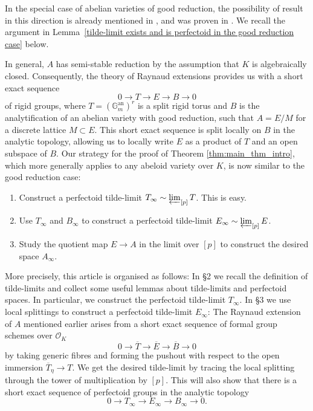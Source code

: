 \documentclass[10pt,oneside]{amsart}
\theoremstyle{definition}
\renewcommand{\O}{\mathcal{O}}
\begin{document}
In the special case of abelian varieties of good reduction, the possibility of result in this direction is already mentioned in \cite[\S 7 and \S 13]{survey}, and was proven in \cite[Lemme~A.16]{Pilloni-Stroh}. We recall the argument in Lemma~\ref{tilde-limit exists and is perfectoid in the good reduction case} below. 

In general, $A$ has semi-stable reduction by the assumption that $K$ is algebraically closed.
Consequently, the theory of Raynaud extensions provides us with a short exact sequence 
\[ 0 \rightarrow T \rightarrow E  \rightarrow  B  \rightarrow  0\]
of rigid groups, where $T = (\mathbb G_m^{\text{an}})^{r}$ is a split rigid torus and $B$ is the analytification of an abelian variety with good reduction, such that $A = E/M$ for a discrete lattice $M \subset E$. This short exact sequence is split locally on $B$ in the analytic topology, allowing us to locally write $E$ as a product of $T$ and an open subspace of $B$.
Our strategy for the proof of Theorem \ref{thm:main_thm_intro}, which more generally applies to any abeloid variety over $K$, is now similar to the good reduction case:
\begin{enumerate}
\item Construct a perfectoid tilde-limit $T_\infty\sim\varprojlim_{[p]} T$. This is easy.
\item Use $T_\infty$ and $B_\infty$ to construct a perfectoid tilde-limit $E_\infty\sim\varprojlim_{[p]} E$.
\item Study the quotient map $E\rightarrow A$ in the limit over $[p]$ to construct the desired space $A_\infty$.
\end{enumerate}

More precisely, this article is organised as follows: In \S2 we recall the definition of tilde-limits and collect some useful lemmas about tilde-limits and perfectoid spaces. In particular, we construct the perfectoid tilde-limit $T_\infty$. In \S3 we use local splittings to construct a perfectoid tilde-limit $E_\infty$: The Raynaud extension of $A$ mentioned earlier arises from a short exact sequence of formal group schemes over $\O_K$
\[0\rightarrow \overline{T}\rightarrow \overline{E}\rightarrow \overline{B}\rightarrow 0\]
by taking generic fibres and forming the pushout with respect to the open immersion $\overline{T}_\eta\rightarrow T$. We get the desired tilde-limit by tracing the local splitting through the tower of multiplication by $[p]$. This will also show that there is a short exact sequence of perfectoid groups in the analytic topology
\[ 0\to T_\infty \to E_\infty \to B_\infty \to 0.\]
\end{document}
